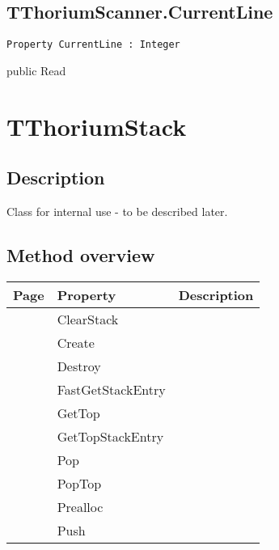 \subsection{TThoriumScanner.CurrentLine}
\label{thoriumcorepkg:thorium:tthoriumscanner:currentline}
\begin{FPCList}
\Declaration 

\begin{verbatim}
Property CurrentLine : Integer
\end{verbatim}
\Visibility
public
\Access
Read
\end{FPCList}
\section{TThoriumStack}
\label{thoriumcorepkg:thorium:tthoriumstack}
\subsection{Description}
Class for internal use - to be described later.%
\subsection{Method overview}
\label{thoriumcorepkg:thorium:tthoriumstack:methods}
\begin{tabularx}{\textwidth}{llX}
Page & Property & Description  \\ \hline
\pageref{thoriumcorepkg:thorium:tthoriumstack:clearstack} & ClearStack  &  \\
\pageref{thoriumcorepkg:thorium:tthoriumstack:create} & Create  &  \\
\pageref{thoriumcorepkg:thorium:tthoriumstack:destroy} & Destroy  &  \\
\pageref{thoriumcorepkg:thorium:tthoriumstack:fastgetstackentry} & FastGetStackEntry  &  \\
\pageref{thoriumcorepkg:thorium:tthoriumstack:gettop} & GetTop  &  \\
\pageref{thoriumcorepkg:thorium:tthoriumstack:gettopstackentry} & GetTopStackEntry  &  \\
\pageref{thoriumcorepkg:thorium:tthoriumstack:pop} & Pop  &  \\
\pageref{thoriumcorepkg:thorium:tthoriumstack:poptop} & PopTop  &  \\
\pageref{thoriumcorepkg:thorium:tthoriumstack:prealloc} & Prealloc  &  \\
\pageref{thoriumcorepkg:thorium:tthoriumstack:push} & Push  &  \\
\hline
\end{tabularx}
